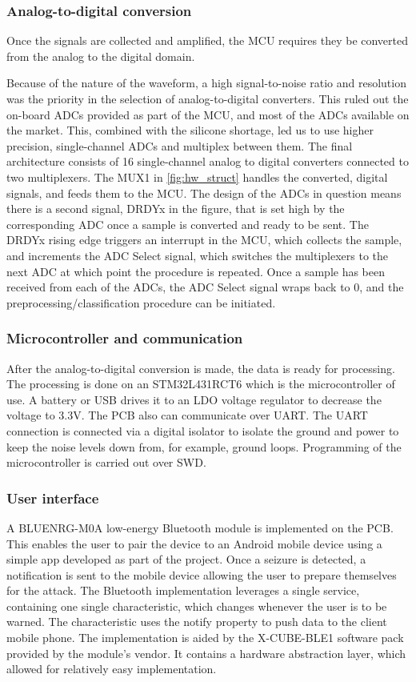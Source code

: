 \subsubsection{Analog-to-digital conversion}
\label{section:ADC}
Once the signals are collected and amplified, the MCU requires they be converted from the analog to the digital domain. 

Because of the nature of the waveform, a high signal-to-noise ratio and resolution was the priority in the selection of analog-to-digital converters. This ruled out the on-board ADCs provided as part of the MCU, and most of the ADCs available on the market. This, combined with the silicone shortage, led us to use higher precision, single-channel ADCs and multiplex between them. The final architecture consists of 16 single-channel analog to digital converters connected to two multiplexers. The MUX1 in \ref{fig:hw_struct} handles the converted, digital signals, and feeds them to the MCU. The design of the ADCs in question means there is a second signal, DRDYx in the figure, that is set high by the corresponding ADC once a sample is converted and ready to be sent. The DRDYx rising edge triggers an interrupt in the MCU, which collects the sample, and increments the ADC Select signal, which switches the multiplexers to the next ADC at which point the procedure is repeated. Once a sample has been received from each of the ADCs, the ADC Select signal wraps back to 0, and the preprocessing/classification procedure can be initiated.

\subsubsection{Microcontroller and communication}
After the analog-to-digital conversion is made, the data is ready for processing. The processing is done on an STM32L431RCT6 which is the microcontroller of use. A battery or USB drives it to an LDO voltage regulator to decrease the voltage to 3.3V. The PCB also can communicate over UART. The UART connection is connected via a digital isolator to isolate the ground and power to keep the noise levels down from, for example, ground loops. Programming of the microcontroller is carried out over SWD.

\subsubsection{User interface}
A BLUENRG-M0A low-energy Bluetooth module is implemented on the PCB. This enables the user to pair the device to an Android mobile device using a simple app developed as part of the project. Once a seizure is detected, a notification is sent to the mobile device allowing the user to prepare themselves for the attack.
The Bluetooth implementation leverages a single service, containing one single characteristic, which changes whenever the user is to be warned. The characteristic uses the notify property to push data to the client mobile phone.
The implementation is aided by the X-CUBE-BLE1 software pack provided by the module's vendor. It contains a hardware abstraction layer, which allowed for relatively easy implementation.

